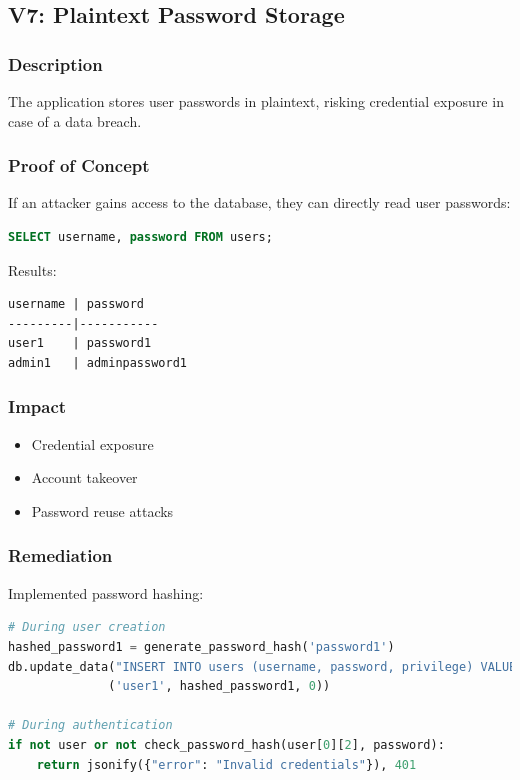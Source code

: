 \documentclass[11pt,a4paper]{article}
\newenvironment{vulnerability}[3]{%
    \begin{tcolorbox}[
        colback=white,
        colframe=#1,
        fonttitle=\bfseries\color{white},
        coltitle=#1,
        title=#2: #3
    ]
}{%
    \end{tcolorbox}
}
\begin{document}
\subsection{V7: Plaintext Password Storage}

\begin{vulnerability}{mediumcolor}{Medium}{Plaintext Password Storage}
\subsubsection*{Description}
The application stores user passwords in plaintext, risking credential exposure in case of a data breach.

\subsubsection*{Proof of Concept}
If an attacker gains access to the database, they can directly read user passwords:

\begin{lstlisting}[language=SQL]
SELECT username, password FROM users;
\end{lstlisting}

Results:
\begin{lstlisting}
username | password
---------|-----------
user1    | password1
admin1   | adminpassword1
\end{lstlisting}

\subsubsection*{Impact}
\begin{itemize}
    \item Credential exposure
    \item Account takeover
    \item Password reuse attacks
\end{itemize}

\subsubsection*{Remediation}
Implemented password hashing:

\begin{lstlisting}[language=Python]
# During user creation
hashed_password1 = generate_password_hash('password1')
db.update_data("INSERT INTO users (username, password, privilege) VALUES (?, ?, ?)", 
              ('user1', hashed_password1, 0))

# During authentication
if not user or not check_password_hash(user[0][2], password):
    return jsonify({"error": "Invalid credentials"}), 401
\end{lstlisting}
\end{vulnerability}
\end{document}
